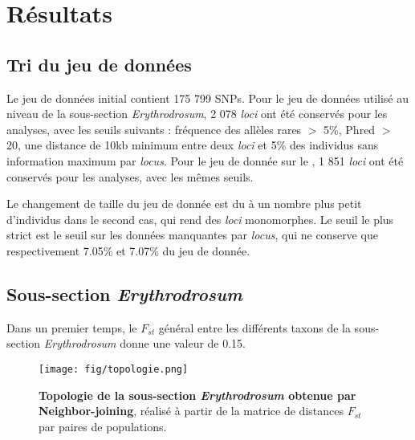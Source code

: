 \section{Résultats}

\subsection{Tri du jeu de données}

Le jeu de données initial contient 175 799 SNPs.
Pour le jeu de données utilisé au niveau de la sous-section \textit{Erythrodrosum}, 2 078 \textit{loci} ont été conservés pour les analyses, avec les seuils suivants :  fréquence des allèles rares $>$ 5\%, Phred $>$ 20, une distance de 10kb minimum entre deux \textit{loci} et 5\% des individus sans information maximum par \textit{locus}.
Pour le jeu de donnée sur le , 1 851 \textit{loci} ont été conservés pour les analyses, avec les mêmes seuils.

Le changement de taille du jeu de donnée est du à un nombre plus petit d'individus dans le second cas, qui rend des \textit{loci} monomorphes. Le seuil le plus strict est le seuil sur les données manquantes par \textit{locus}, qui ne conserve que  respectivement 7.05\% et 7.07\% du jeu de donnée. 

\subsection{Sous-section \textit{Erythrodrosum}}

Dans un premier temps, le $F_{st}$ général entre les différents taxons de la sous-section \textit{Erythrodrosum} donne une valeur de 0.15.%

\begin{wrapfigure}{r}{0.30\textwidth}
	\vspace{-20pt}
	\begin{center}
	\texttt{[image: fig/topologie.png]}
	\end{center}
	\caption{\textbf{Topologie de la sous-section \textit{Erythrodrosum} obtenue par Neighbor-joining}, réalisé à partir de la matrice de distances $F_{st}$ par paires de populations.}
    \label{topologie}
\end{wrapfigure}

